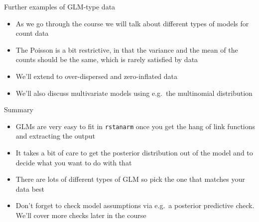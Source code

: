 \documentclass[ignorenonframetext,]{beamer}
\providecommand{\tightlist}{%
  \setlength{\itemsep}{0pt}\setlength{\parskip}{0pt}}
\begin{document}
\begin{frame}{Further examples of GLM-type data}

\begin{itemize}
\tightlist
\item
  As we go through the course we will talk about different types of
  models for count data
\item
  The Poisson is a bit restrictive, in that the variance and the mean of
  the counts should be the same, which is rarely satisfied by data
\item
  We'll extend to over-dispersed and zero-inflated data
\item
  We'll also discuss multivariate models using e.g.~the multinomial
  distribution
\end{itemize}

\end{frame}

\begin{frame}[fragile]{Summary}

\begin{itemize}
\tightlist
\item
  GLMs are very easy to fit in \texttt{rstanarm} once you get the hang
  of link functions and extracting the output
\item
  It takes a bit of care to get the posterior distribution out of the
  model and to decide what you want to do with that
\item
  There are lots of different types of GLM so pick the one that matches
  your data best
\item
  Don't forget to check model assumptions via e.g.~a posterior
  predictive check. We'll cover more checks later in the course
\end{itemize}

\end{frame}
\end{document}
